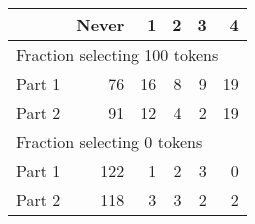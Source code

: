 \begin{tabular}{l r r r r r}\\ \hline\hline 
& Never& 1 &2 &3 &4 \\ \hline 
\multicolumn{6}{l}{Fraction selecting 100 tokens } \\ 
Part 1&76&16& 8& 9&19\\ 
 Part 2&91&12& 4& 2&19\\ 
\multicolumn{6}{l}{Fraction selecting 0 tokens}  \\ 
Part 1&122& 1& 2& 3& 0\\ 
 Part 2&118& 3& 3& 2& 2\\ \hline\hline
\end{tabular} 

